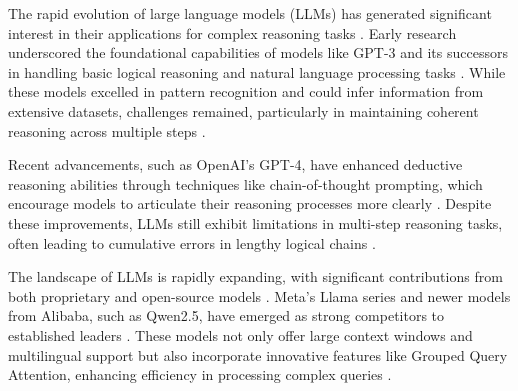 
%
%
%
The rapid evolution of large language models (LLMs) has generated significant interest in their applications for complex reasoning tasks \cite{chen2024large, hadi2024large}. Early research underscored the foundational capabilities of models like GPT-3 and its successors in handling basic logical reasoning and natural language processing tasks \cite{zhang2021commentary, kalyan2023survey}. While these models excelled in pattern recognition and could infer information from extensive datasets, challenges remained, particularly in maintaining coherent reasoning across multiple steps \cite{yang2024harnessing}.

Recent advancements, such as OpenAI's GPT-4, have enhanced deductive reasoning abilities through techniques like chain-of-thought prompting, which encourage models to articulate their reasoning processes more clearly \cite{gou2024rationality}. Despite these improvements, LLMs still exhibit limitations in multi-step reasoning tasks, often leading to cumulative errors in lengthy logical chains \cite{tong2024can}.

The landscape of LLMs is rapidly expanding, with significant contributions from both proprietary and open-source models \cite{he2023survey}. Meta's Llama series and newer models from Alibaba, such as Qwen2.5, have emerged as strong competitors to established leaders \cite{hui2024qwen2, yang2024qwen2}. These models not only offer large context windows and multilingual support but also incorporate innovative features like Grouped Query Attention, enhancing efficiency in processing complex queries \cite{yang2024harnessing}.

